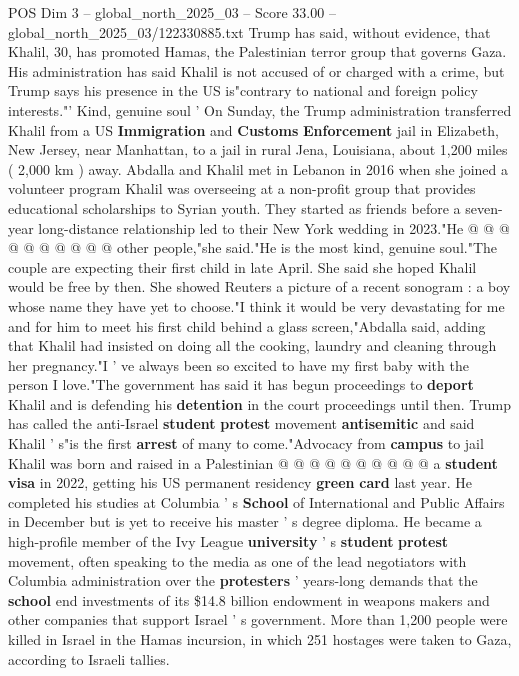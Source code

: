 \begin{textsample}{POS Dim 3 – global\_north\_2025\_03 – Score 33.00 – global\_north\_2025\_03/122330885.txt}
Trump has said, without evidence, that Khalil, 30, has promoted Hamas, the Palestinian terror group that governs Gaza.
His administration has said Khalil is not accused of or charged with a crime, but Trump says his presence in the US is"contrary to national and foreign policy interests."' Kind, genuine soul ' On Sunday, the Trump administration transferred Khalil from a US \textbf{Immigration} and \textbf{Customs} \textbf{Enforcement} jail in Elizabeth, New Jersey, near Manhattan, to a jail in rural Jena, Louisiana, about 1,200 miles ( 2,000 km ) away.
Abdalla and Khalil met in Lebanon in 2016 when she joined a volunteer program Khalil was overseeing at a non-profit group that provides educational scholarships to Syrian youth.
They started as friends before a seven-year long-distance relationship led to their New York wedding in 2023."He @ @ @ @ @ @ @ @ @ @ other people,"she said."He is the most kind, genuine soul."The couple are expecting their first child in late April.
She said she hoped Khalil would be free by then.
She showed Reuters a picture of a recent sonogram : a boy whose name they have yet to choose."I think it would be very devastating for me and for him to meet his first child behind a glass screen,"Abdalla said, adding that Khalil had insisted on doing all the cooking, laundry and cleaning through her pregnancy."I ' ve always been so excited to have my first baby with the person I love."The government has said it has begun proceedings to \textbf{deport} Khalil and is defending his \textbf{detention} in the court proceedings until then.
Trump has called the anti-Israel \textbf{student} \textbf{protest} movement \textbf{antisemitic} and said Khalil ' s"is the first \textbf{arrest} of many to come."Advocacy from \textbf{campus} to jail Khalil was born and raised in a Palestinian @ @ @ @ @ @ @ @ @ @ a \textbf{student} \textbf{visa} in 2022, getting his US permanent residency \textbf{green} \textbf{card} last year.
He completed his studies at Columbia ' s \textbf{School} of International and Public Affairs in December but is yet to receive his master ' s degree diploma.
He became a high-profile member of the Ivy League \textbf{university} ' s \textbf{student} \textbf{protest} movement, often speaking to the media as one of the lead negotiators with Columbia administration over the \textbf{protesters} ' years-long demands that the \textbf{school} end investments of its \$14.8 billion endowment in weapons makers and other companies that support Israel ' s government.
More than 1,200 people were killed in Israel in the Hamas incursion, in which 251 hostages were taken to Gaza, according to Israeli tallies.

\end{textsample}
